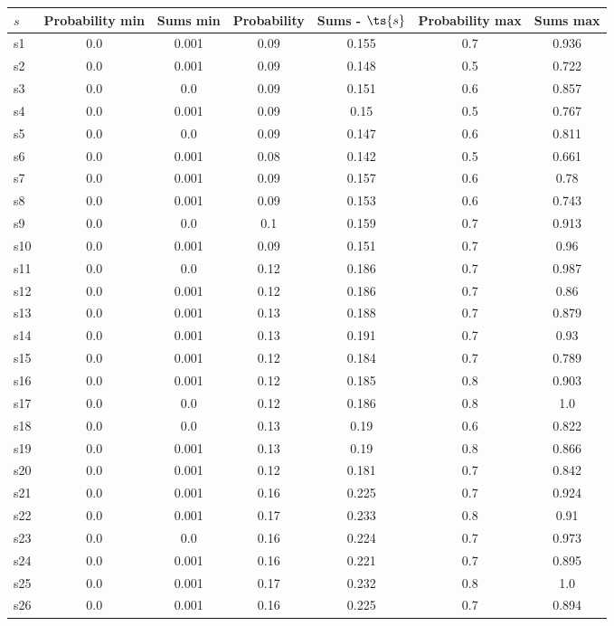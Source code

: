 \documentclass{article}
\begin{document}
\noindent\begin{tabular}{|l|c|c|c|c|c|c|}
\hline
$s$& Probability min & Sums min & Probability & Sums - $\ts{s}$ & Probability max & Sums max\\
\hline
s1 &0.0 & 0.001 & 0.09 & 0.155 & 0.7 & 0.936\\
\hline
s2 &0.0 & 0.001 & 0.09 & 0.148 & 0.5 & 0.722\\
\hline
s3 &0.0 & 0.0 & 0.09 & 0.151 & 0.6 & 0.857\\
\hline
s4 &0.0 & 0.001 & 0.09 & 0.15 & 0.5 & 0.767\\
\hline
s5 &0.0 & 0.0 & 0.09 & 0.147 & 0.6 & 0.811\\
\hline
s6 &0.0 & 0.001 & 0.08 & 0.142 & 0.5 & 0.661\\
\hline
s7 &0.0 & 0.001 & 0.09 & 0.157 & 0.6 & 0.78\\
\hline
s8 &0.0 & 0.001 & 0.09 & 0.153 & 0.6 & 0.743\\
\hline
s9 &0.0 & 0.0 & 0.1 & 0.159 & 0.7 & 0.913\\
\hline
s10 &0.0 & 0.001 & 0.09 & 0.151 & 0.7 & 0.96\\
\hline
s11 &0.0 & 0.0 & 0.12 & 0.186 & 0.7 & 0.987\\
\hline
s12 &0.0 & 0.001 & 0.12 & 0.186 & 0.7 & 0.86\\
\hline
s13 &0.0 & 0.001 & 0.13 & 0.188 & 0.7 & 0.879\\
\hline
s14 &0.0 & 0.001 & 0.13 & 0.191 & 0.7 & 0.93\\
\hline
s15 &0.0 & 0.001 & 0.12 & 0.184 & 0.7 & 0.789\\
\hline
s16 &0.0 & 0.001 & 0.12 & 0.185 & 0.8 & 0.903\\
\hline
s17 &0.0 & 0.0 & 0.12 & 0.186 & 0.8 & 1.0\\
\hline
s18 &0.0 & 0.0 & 0.13 & 0.19 & 0.6 & 0.822\\
\hline
s19 &0.0 & 0.001 & 0.13 & 0.19 & 0.8 & 0.866\\
\hline
s20 &0.0 & 0.001 & 0.12 & 0.181 & 0.7 & 0.842\\
\hline
s21 &0.0 & 0.001 & 0.16 & 0.225 & 0.7 & 0.924\\
\hline
s22 &0.0 & 0.001 & 0.17 & 0.233 & 0.8 & 0.91\\
\hline
s23 &0.0 & 0.0 & 0.16 & 0.224 & 0.7 & 0.973\\
\hline
s24 &0.0 & 0.001 & 0.16 & 0.221 & 0.7 & 0.895\\
\hline
s25 &0.0 & 0.001 & 0.17 & 0.232 & 0.8 & 1.0\\
\hline
s26 &0.0 & 0.001 & 0.16 & 0.225 & 0.7 & 0.894\\

\end{tabular}
\end{document}
